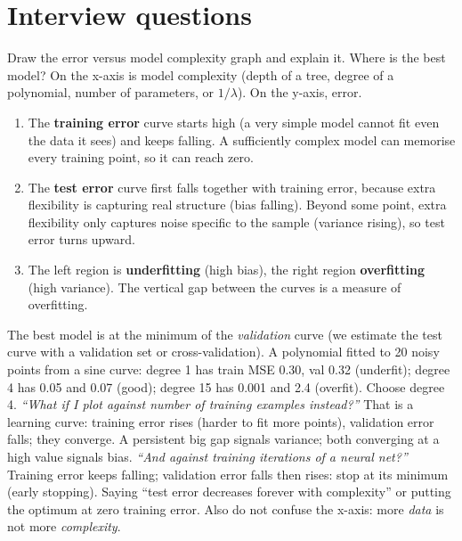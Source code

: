 \section{Interview questions}

\begin{qa}{ Draw the error versus model complexity graph and
explain it. Where is the best model?}
\why
On the x-axis is model complexity (depth of a tree, degree of a polynomial, number of parameters, or
$1/\lambda$). On the y-axis, error.
\begin{enumerate}
\item The \textbf{training error} curve starts high (a very simple model cannot fit even the data it sees)
  and keeps falling. A sufficiently complex model can memorise every training point, so it can reach zero.
\item The \textbf{test error} curve first falls together with training error, because extra flexibility
  is capturing real structure (bias falling). Beyond some point, extra flexibility only captures noise
  specific to the sample (variance rising), so test error turns upward.
\item The left region is \textbf{underfitting} (high bias), the right region \textbf{overfitting} (high
  variance). The vertical gap between the curves is a measure of overfitting.
\end{enumerate}
The best model is at the minimum of the \emph{validation} curve (we estimate the test curve with a validation
set or cross-validation).
\worked A polynomial fitted to 20 noisy points from a sine curve: degree 1 has train MSE 0.30, val 0.32
(underfit); degree 4 has 0.05 and 0.07 (good); degree 15 has 0.001 and 2.4 (overfit). Choose degree 4.
\pushes
\emph{``What if I plot against number of training examples instead?''} That is a learning curve: training
error rises (harder to fit more points), validation error falls; they converge. A persistent big gap
signals variance; both converging at a high value signals bias.
\emph{``And against training iterations of a neural net?''} Training error keeps falling; validation error
falls then rises: stop at its minimum (early stopping).
\pitfall Saying ``test error decreases forever with complexity'' or putting the optimum at zero training
error. Also do not confuse the x-axis: more \emph{data} is not more \emph{complexity}.
\end{qa}

